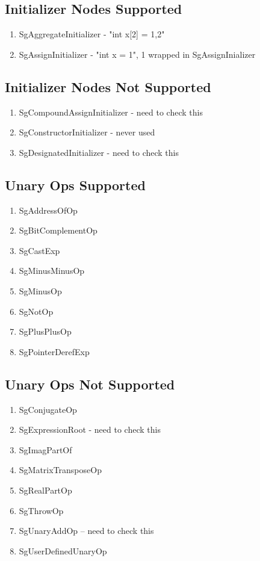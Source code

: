 \documentclass[11pt]{article}
\begin{document}
{\begin{enumeration}
\subsection{Initializer Nodes Supported}
\begin{enumerate}
\item SgAggregateInitializer - "int x[2] = {1,2}"
\item SgAssignInitializer - "int x = 1", 1 wrapped in SgAssignInializer
\end{enumerate}

\subsection{Initializer Nodes Not Supported}
\begin{enumerate}
\item SgCompoundAssignInitializer - need to check this
\item SgConstructorInitializer - never used
\item SgDesignatedInitializer - need to check this
\end{enumerate}

\subsection{Unary Ops Supported}
\begin{enumerate}
\item SgAddressOfOp
\item SgBitComplementOp
\item SgCastExp
\item SgMinusMinusOp
\item SgMinusOp
\item SgNotOp
\item SgPlusPlusOp
\item SgPointerDerefExp
\end{enumerate}

\subsection{Unary Ops Not Supported}
\begin{enumerate}
\item SgConjugateOp
\item SgExpressionRoot - need to check this
\item SgImagPartOf
\item SgMatrixTransposeOp
\item SgRealPartOp
\item SgThrowOp
\item SgUnaryAddOp -- need to check this
\item SgUserDefinedUnaryOp
\end{enumerate}


\end{enumeration}}
\end{document}
